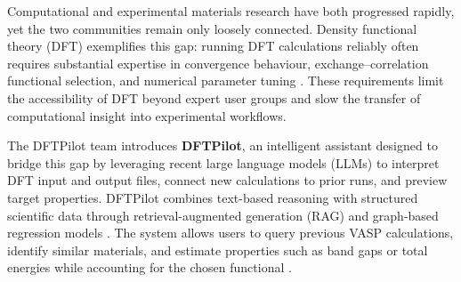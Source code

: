 


Computational and experimental materials research have both progressed rapidly, yet the two communities remain only loosely connected. Density functional theory (DFT) \cite{hohenberg1964inhomogeneous, kohn1965self} exemplifies this gap: running DFT calculations reliably often requires substantial expertise in convergence behaviour, exchange–correlation functional selection, and numerical parameter tuning \cite{squires2025guidelines}. These requirements limit the accessibility of DFT beyond expert user groups and slow the transfer of computational insight into experimental workflows.

The DFTPilot team introduces \textbf{DFTPilot}, an intelligent assistant designed to bridge this gap by leveraging recent large language models (LLMs) \cite{brown2020language, openai2024gpt4technicalreport} to interpret DFT input and output files, connect new calculations to prior runs, and preview target properties. DFTPilot combines text-based reasoning with structured scientific data through retrieval-augmented generation (RAG) \cite{lewis2020retrieval, izacard2020distilling} and graph-based regression models \cite{xie2018crystal, chen2019graph, himanen2020dscribe}. The system allows users to query previous VASP calculations, identify similar materials, and estimate properties such as band gaps or total energies while accounting for the chosen functional \cite{perdew1996generalized, becke1988density}.

